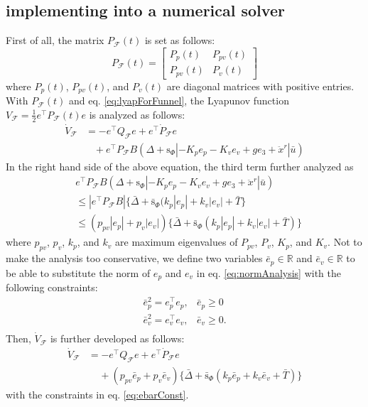 \documentclass[letterpaper, 10 pt, conference]{ieeeconf}  %
\begin{document}
\subsection{implementing into a numerical solver}
First of all, the matrix $P_\mathcal{F}(t)$ is set as follows:
\begin{equation}
P_\mathcal{F}(t) = \left[
\begin{array}{cc}
P_p(t) & P_{pv}(t) \\
P_{pv}(t) & P_v(t)
\end{array}
\right] \nonumber
\end{equation}
where $P_p(t)$, $P_{pv}(t)$, and $P_v(t)$ are diagonal matrices with positive entries.
With $P_\mathcal{F}(t)$ and eq. \eqref{eq:lyapForFunnel}, the Lyapunov function $V_\mathcal{F} = \frac{1}{2}e^\intercal P_\mathcal{F}(t) e$ is analyzed as follows: 
\begin{align}
\dot{V}_\mathcal{F} &= -e^\intercal Q_\mathcal{F} e + e^\intercal \dot{P}_\mathcal{F} e\nonumber \\
&\;\;\;+e^\intercal P_\mathcal{F} B(\Delta+\text{s}_\Phi|-K_pe_p -K_ve_v + ge_3 + \ddot{x}^r|\bar{u}) \nonumber
\end{align}
In the right hand side of the above equation, the third term further analyzed as
\begin{align}
&e^\intercal P_\mathcal{F} B(\Delta+\text{s}_\Phi|-K_p e_p -K_v e_v + ge_3 + \ddot{x}^r|\bar{u}) \nonumber \\
&\leq |e^\intercal P_\mathcal{F}B|\{\bar{\Delta} + \bar{\text{s}}_\Phi(k_p|e_p| + k_v|e_v| + \bar{T}\} \nonumber \\
&\leq (p_{pv}|e_p|+p_v|e_v|)\{\bar{\Delta}+\bar{\text{s}}_\Phi(k_p|e_p|+k_v|e_v|+\bar{T})\} \label{eq:normAnalysis}
\end{align}
where $p_{pv}$, $p_v$, $k_p$, and $k_v$ are maximum eigenvalues of $P_{pv}$, $P_v$, $K_p$, and $K_v$.
Not to make the analysis too conservative, 
we define two variables $\bar{e}_p\in\mathbb{R}$ and $\bar{e}_v\in\mathbb{R}$ to be able to substitute the norm of $e_p$ and $e_v$ in eq. \eqref{eq:normAnalysis} with the following constraints:
\begin{equation}
\begin{array}{ll}
\bar{e}_p^2 = e_p^\intercal e_p, & \bar{e}_p \geq 0 \\
\bar{e}_v^2 = e_v^\intercal e_v, & \bar{e}_v \geq 0. \\
\end{array} \label{eq:ebarConst} 
\end{equation} 
Then, $\dot{V}_\mathcal{F}$ is further developed as follows:
\begin{align}
\dot{V}_\mathcal{F} &= -e^\intercal Q_\mathcal{F} e + e^\intercal \dot{P}_\mathcal{F}e \label{eq:vdot} \\
 &\;\;\;\;+(p_{pv}\bar{e}_p+p_v\bar{e}_v)\{\bar{\Delta} + \bar{\text{s}}_\Phi(k_p\bar{e}_p+k_v\bar{e}_v + \bar{T})\} \nonumber 
\end{align}
with the constraints in eq. \eqref{eq:ebarConst}.
\end{document}
